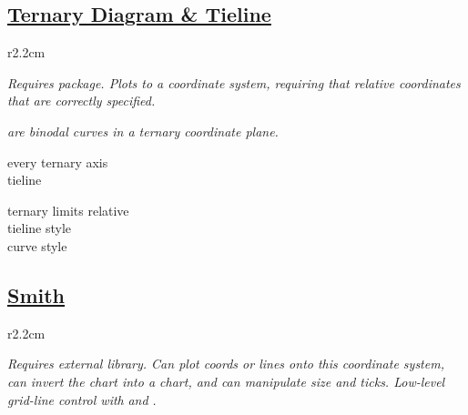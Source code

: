 \subsection*{\href{\docurl\#pgfp./tikz/tieline}{Ternary Diagram \& Tieline}}

\begin{wrapfigure}[5]{r}{2.2cm}
\vspace{-8mm}
\resizebox{2cm}{!}{}
\end{wrapfigure}

\textit{Requires  package. Plots to a  coordinate system, requiring that relative coordinates that are correctly specified. }

\begin{comment}
\begin{wrapfigure}[2]{l}{2.2cm}
\vspace{-8mm}
\resizebox{2cm}{!}{}
\end{wrapfigure}
\end{comment}

\textit{ are binodal curves in a ternary coordinate plane.}

{\color{blue}
\begin{minipage}[t]{3.0cm}
every ternary axis\\
tieline
\end{minipage}
\begin{minipage}[t]{3.3cm}
ternary limits relative\\
tieline style\\
curve style
\end{minipage}}

\subsection*{\href{\docurl\#pgfp.smithchart}{Smith}}


\begin{wrapfigure}[5]{r}{2.2cm}
\vspace{-8mm}
\resizebox{2cm}{!}{}
\end{wrapfigure}

\textit{Requires external  library. Can plot coords or lines onto this coordinate system, can invert the chart into a  chart, and can manipulate size and ticks. Low-level grid-line control with }\href{}{}\textit{ and }\href{}{}\textit{.}


